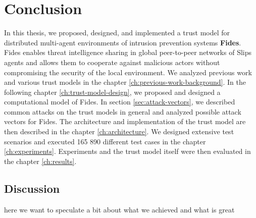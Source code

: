 \chapter{Conclusion}
\label{ch:conclusion}
In this thesis, we proposed, designed, and implemented a trust model for distributed multi-agent environments of intrusion prevention systems \textbf{Fides}.
Fides enables threat intelligence sharing in global peer-to-peer networks of Slips agents and allows them to cooperate against malicious actors without compromising the security of the local environment. 
We analyzed previous work and various trust models in the chapter \ref{ch:previous-work-background}.
In the following chapter \ref{ch:trust-model-design}, we proposed and designed a computational model of Fides.
In section \ref{sec:attack-vectors}, we described common attacks on the trust models in general and analyzed possible attack vectors for Fides.
The architecture and implementation of the trust model are then described in the chapter \ref{ch:architecture}.
We designed extensive test scenarios and executed 165 890 different test cases in the chapter \ref{ch:experiments}.
Experiments and the trust model itself were then evaluated in the chapter \ref{ch:results}.


\section{Discussion}
\label{sec:discussion}
here we want to speculate a bit about what we achieved and what is great

